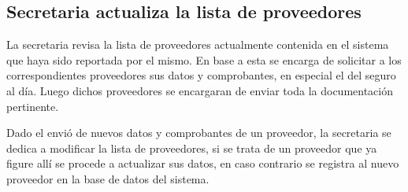 \documentclass{article}
\theoremstyle{definition}
\theoremstyle{remark}
\begin{document}
\subsection{Secretaria actualiza la lista de proveedores}

La secretaria revisa la lista de proveedores actualmente contenida en el sistema que haya sido reportada por el mismo. En base a esta se encarga de solicitar a los correspondientes proveedores sus datos y comprobantes, en especial el del seguro al día. Luego dichos proveedores se encargaran de enviar toda la documentación pertinente.

\vspace{5px}

Dado el envió de nuevos datos y comprobantes de un proveedor, la secretaria se dedica a modificar la lista de proveedores, si se trata de un proveedor que ya figure allí se procede a actualizar sus datos, en caso contrario se registra al nuevo proveedor en la base de datos del sistema.



\end{document}
